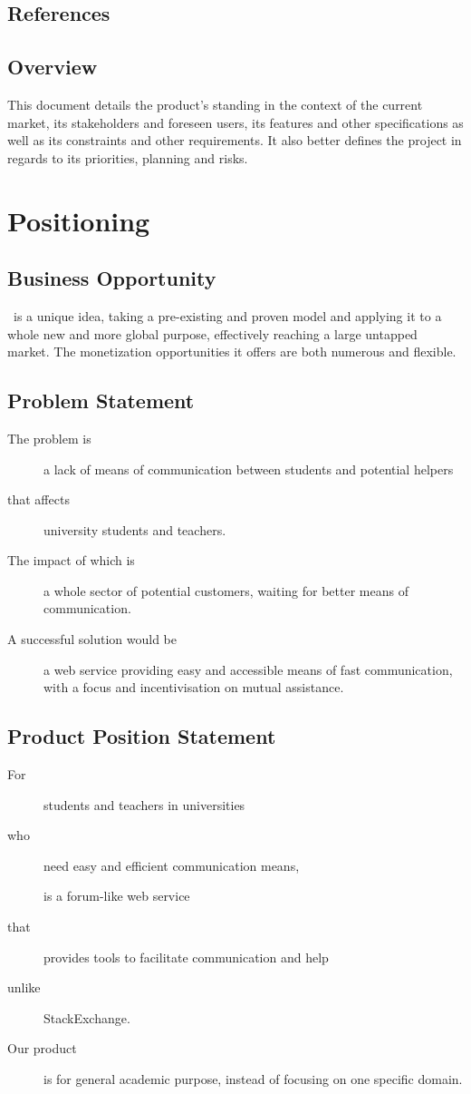 \documentclass [a4paper, 11pt]{article}
\newcommand \projectname{\mbox{\bsc{Academi-co}}}
\begin{document}
\subsection{References}


\subsection{Overview}
This document details the product's standing in the context of the current market, its stakeholders and foreseen users, its features and other specifications as well as its constraints and other requirements. It also better defines the project in regards to its priorities, planning and risks.



\section{Positioning}
\subsection{Business Opportunity}
\projectname \ is a unique idea, taking a pre-existing and proven model and applying it to a whole new and more global purpose, effectively reaching a large untapped market. The monetization opportunities it offers are both numerous and flexible.

\subsection{Problem Statement}
\begin{description}
	\item [The problem is] a lack of means of communication between students and potential helpers
	\item [that affects] university students and teachers.
	\item [The impact of which is] a whole sector of potential customers, waiting for better means of communication.
	\item [A successful solution would be] a web service providing easy and accessible means of fast communication, with a focus and incentivisation on mutual assistance.
\end{description}

\subsection{Product Position Statement}
\begin{description}
	\item [For] students and teachers in universities
	\item [who] need easy and efficient communication means,
	\item [\projectname] is a forum-like web service
	\item [that] provides tools to facilitate communication and help
	\item [unlike] StackExchange.
	\item [Our product] is for general academic purpose, instead of focusing on one specific domain.
\end{description}
\end{document}
